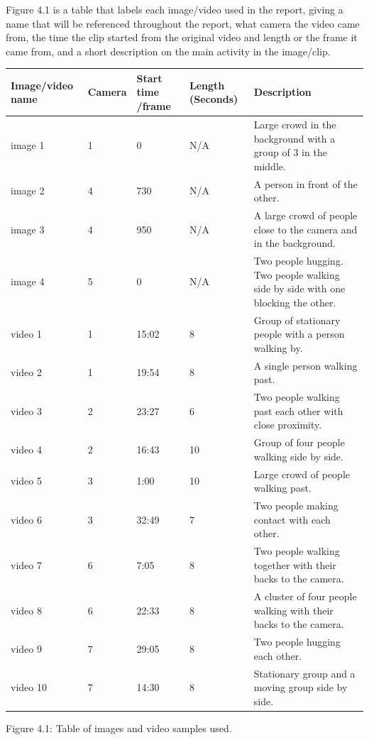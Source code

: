 \documentclass[12pt]{report}
\begin{document}
Figure 4.1 is a table that labels each image/video used in the report, giving a name that will be referenced throughout the report, what camera the video came from, the time the clip started from the original video and length or the frame it came from, and a short description on the main activity in the image/clip.

\vspace{5mm}

\begin{center}
\small
	\begin{tabular}{|p{2.2cm}|l|p{1.8cm}|p{2cm}|p{5cm}|}
		\hline
		Image/video name & Camera & Start time /frame & Length (Seconds) & Description \\
		\hline
		image 1 & 1 & 0 & N/A & Large crowd in the background with a group of 3 in the middle. \\
		\hline
		image 2 & 4 & 730 & N/A & A person in front of the other. \\
		\hline
		image 3 & 4 & 950 & N/A & A large crowd of people close to the camera and in the background. \\
		\hline
		image 4 & 5 & 0 & N/A & Two people hugging. Two people walking side by side with one blocking the other. \\
		\hline
		video 1 & 1 & 15:02 & 8 & Group of stationary people with a person walking by. \\
		\hline
		video 2 & 1 & 19:54 & 8 & A single person walking past. \\
		\hline
		video 3 & 2 & 23:27 & 6 & Two people walking past each other with close proximity. \\
		\hline
		video 4 & 2 & 16:43 & 10 & Group of four people walking side by side. \\
		\hline
		video 5 & 3 & 1:00 & 10 & Large crowd of people walking past. \\
		\hline
		video 6 & 3 & 32:49 & 7 & Two people making contact with each other. \\ 
		\hline
		video 7 & 6 & 7:05 & 8 & Two people walking together with their backs to the camera. \\
		\hline
		video 8 & 6 & 22:33 & 8 & A cluster of four people walking with their backs to the camera. \\
		\hline 
		video 9 & 7 & 29:05 & 8 & Two people hugging each other. \\
		\hline
		video 10 & 7 & 14:30 & 8 & Stationary group and a moving group side by side. \\
		\hline
	\end{tabular}
\vspace{4mm}

{Figure 4.1: Table of images and video samples used.}

\end{center}
\end{document}
